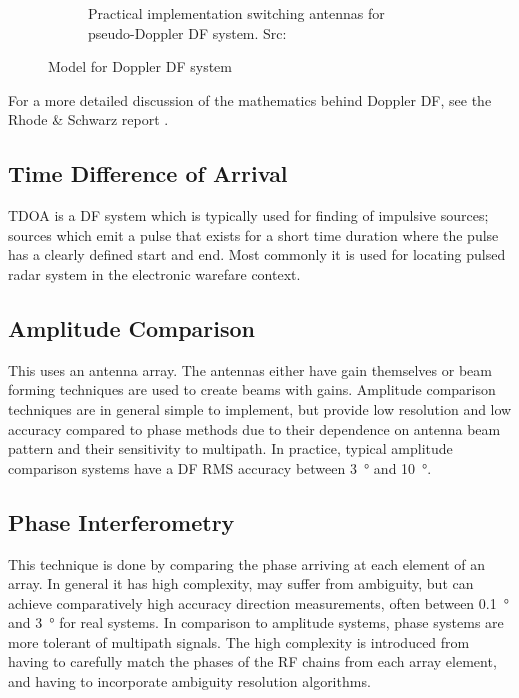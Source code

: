 \begin{figure}
\begin{subfigure}[b]{0.48\textwidth}
    \caption{Practical implementation switching antennas for pseudo-Doppler DF system. Src: \cite{jenkins1991smallaperture}}
  \end{subfigure}
  \caption{Model for Doppler DF system}
  \label{fig:lit-review-doppler-switching}
\end{figure}

For a more detailed discussion of the mathematics behind Doppler DF, see the Rhode \& Schwarz report \cite{rhode2000introtodf}. 

\subsection{Time Difference of Arrival}
TDOA  is a DF system which is typically used for finding of impulsive sources; sources which emit a pulse that exists for a short time duration where the pulse has a clearly defined start and end. Most commonly it is used for locating pulsed radar system in the electronic warefare context.


\subsection{Amplitude Comparison}
This uses an antenna array. The antennas either have gain themselves or beam forming techniques are used to create beams with gains. Amplitude comparison techniques are in general simple to implement, but provide low resolution and low accuracy compared to phase methods due to their dependence on antenna beam pattern and their sensitivity to multipath. In practice, typical amplitude comparison systems have a DF RMS accuracy between \SI{3}{\degree} and \SI{10}{\degree}.
\subsection{Phase Interferometry}
This technique is done by comparing the phase arriving at each element of an array. In general it has high complexity, may suffer from ambiguity, but can achieve comparatively high accuracy direction measurements, often between \SI{0.1}{\degree} and \SI{3}{\degree} for real systems. In comparison to amplitude systems, phase systems are more tolerant of multipath signals. The high complexity is introduced from having to carefully match the phases of the RF chains from each array element, and having to incorporate ambiguity resolution algorithms. 

